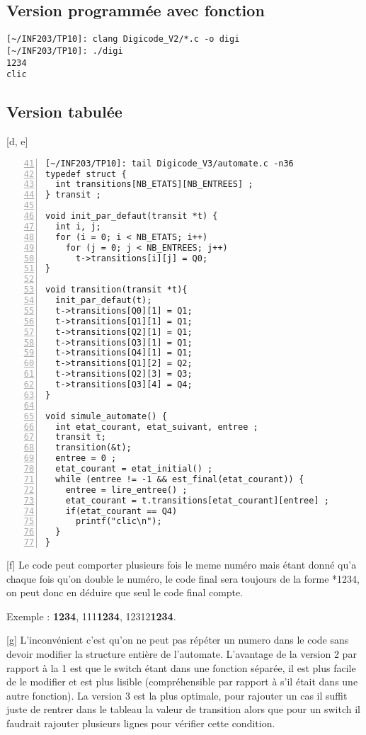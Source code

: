 \documentclass[12pt,a4paper,notitlepage,colorinlistoftodos]{article}
\begin{document}
\newpage
\subsection{Version programmée avec fonction}

\begin{lstlisting}[language = rshell]
[~/INF203/TP10]: clang Digicode_V2/*.c -o digi
[~/INF203/TP10]: ./digi 
1234
clic
\end{lstlisting}


\subsection{Version tabulée}

[d, e]

\begin{lstlisting}[numbers=left, firstnumber = 41]
[~/INF203/TP10]: tail Digicode_V3/automate.c -n36
typedef struct {
  int transitions[NB_ETATS][NB_ENTREES] ;
} transit ;

void init_par_defaut(transit *t) {
  int i, j;
  for (i = 0; i < NB_ETATS; i++)
    for (j = 0; j < NB_ENTREES; j++)
      t->transitions[i][j] = Q0;
}

void transition(transit *t){
  init_par_defaut(t);
  t->transitions[Q0][1] = Q1;
  t->transitions[Q1][1] = Q1;
  t->transitions[Q2][1] = Q1;
  t->transitions[Q3][1] = Q1;
  t->transitions[Q4][1] = Q1;
  t->transitions[Q1][2] = Q2;
  t->transitions[Q2][3] = Q3;
  t->transitions[Q3][4] = Q4;
}

void simule_automate() {
  int etat_courant, etat_suivant, entree ;
  transit t;
  transition(&t);
  entree = 0 ;
  etat_courant = etat_initial() ;
  while (entree != -1 && est_final(etat_courant)) {
    entree = lire_entree() ;
    etat_courant = t.transitions[etat_courant][entree] ;
    if(etat_courant == Q4)
      printf("clic\n");
  }
}
\end{lstlisting}

[f]
Le code peut comporter plusieurs fois le meme numéro mais étant donné qu'a chaque fois qu'on double le numéro, le code final
sera toujours de la forme *1234, on peut donc en déduire que seul le code final compte.

Exemple : \textbf{1234}, 111\textbf{1234}, 12312\textbf{1234}.


[g]
L'inconvénient c'est qu'on ne peut pas répéter un numero dans le code sans devoir modifier la structure entière de l'automate.
L'avantage de la version 2 par rapport à la 1 est que le switch étant dans une fonction séparée, il est plus facile de le modifier
et est plus lisible (compréhensible par rapport à s'il était dans une autre fonction).
La version 3 est la plus optimale, pour rajouter un cas il suffit juste de rentrer dans le tableau la valeur de transition alors que 
pour un switch il faudrait rajouter plusieurs lignes pour vérifier cette condition.
\end{document}
